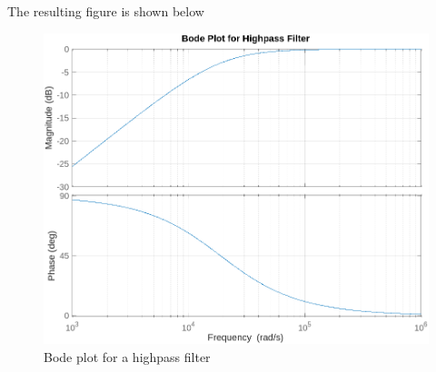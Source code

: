 \documentclass[a4paper,12pt]{article}
\begin{document}
The resulting figure is shown below

\begin{figure}[H]
    \centering
    \includegraphics[width=\linewidth]{q3.png}
    \caption{Bode plot for a highpass filter}\label{fig:q3}
\end{figure}
\end{document}
